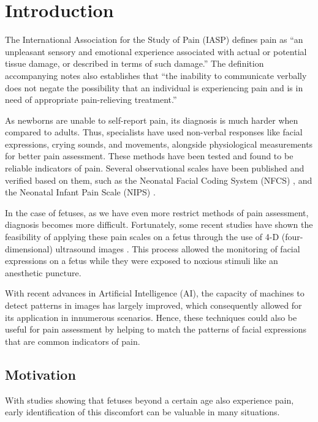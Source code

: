 \chapter{Introduction}

The International Association for the Study of Pain (IASP) defines pain as ``an unpleasant sensory and emotional experience associated with actual or potential tissue damage, or described in terms of such damage.'' \citep{merskey1994classification} The definition accompanying notes also establishes that ``the inability to communicate verbally does not negate the possibility that an individual is experiencing pain and is in need of appropriate pain-relieving treatment.''

As newborns are unable to self-report pain, its diagnosis is much harder when compared to adults. Thus, specialists have used non-verbal responses like facial expressions, crying sounds, and movements, alongside physiological measurements for better pain assessment. These methods have been tested and found to be reliable indicators of pain. Several observational scales have been published and verified based on them, such as the Neonatal Facial Coding System (NFCS) \citep{Grunau1998}, and the Neonatal Infant Pain Scale (NIPS) \citep{HudsonBarr2002}.

In the case of fetuses, as we have even more restrict methods of pain assessment, diagnosis becomes more difficult. Fortunately, some recent studies have shown the feasibility of applying these pain scales on a fetus through the use of 4-D (four-dimensional) ultrasound images \citep{bernardes2018feasibility}. This process allowed the monitoring of facial expressions on a fetus while they were exposed to noxious stimuli like an anesthetic puncture.

With recent advances in Artificial Intelligence (AI), the capacity of machines to detect patterns in images has largely improved, which consequently allowed for its application in innumerous scenarios. Hence, these techniques could also be useful for pain assessment by helping to match the patterns of facial expressions that are common indicators of pain.

\section{Motivation}

With studies showing that fetuses beyond a certain age also experience pain, early identification of this discomfort can be valuable in many situations.

